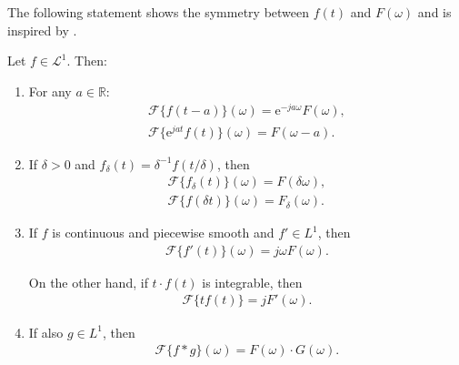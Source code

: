 \noindent
The following statement shows the symmetry between $f(t)$ and $F(\omega)$ and is inspired by \cite{page 214, FAA}.

\begin{theorem} \label{theorem:fund_sym_Fourier}
Let $f \in \mathcal{L}^1$. Then:

\begin{enumerate}[label=(\alph*)]
\item For any $a \in \mathbb{R}$: \label{theorem:fund_sym_Fourier_a}
\begin{align*}
\mathcal{F}\{f(t-a)\}(\omega) = \text{e}^{-ja\omega} F(\omega), \\
\mathcal{F}\{\text{e}^{jat}f(t)\}(\omega) = F(\omega - a).
\end{align*}

\item If $\delta > 0$ and $f_\delta(t)=\delta^{-1}f(t/\delta)$, then
\label{theorem:fund_sym_Fourier_b}
\begin{align*}
\mathcal{F}\{f_\delta(t)\}(\omega) = F(\delta\omega), \\
\mathcal{F}\{f(\delta t)\}(\omega) = F_\delta(\omega).
\end{align*}

\item If $f$ is continuous and piecewise smooth and $f' \in L^1$, then
\begin{align*}
\mathcal{F}\{f'(t)\}(\omega) = j\omega F(\omega).
\end{align*}

On the other hand, if $t\cdot f(t)$ is integrable, then
\begin{align*}
\mathcal{F}\{tf(t)\} = j F'(\omega).
\end{align*}

\item If also $g \in L^1$, then
\begin{align*}
\mathcal{F}\{f*g\}(\omega) = F(\omega) \cdot G(\omega).
\end{align*}
\end{enumerate}
\end{theorem}

